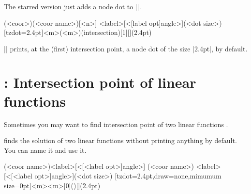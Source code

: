 The starred version \icmd{\tzhXpoint*} just adds a node dot to |\tzhXpoint|.

\begin{tzdef}
(<coor>)(<coor name>)[<n>]
           {<label>}[<[label opt]angle>](<dot size>)
  [tzdot=2.4pt]{<m>}(<m>)(intersection)[1]{}[](2.4pt)
\end{tzdef}

|\tzhXpoint*| prints, at the (first) intersection point, a node dot of the size |2.4pt|, by default.

\begin{tzcode}{.3}
\end{tzcode}


\section{\protect\cmd{\tzLFnXpoint(*)}: Intersection point of linear functions}
\label{s:tzLFnXpoint}

Sometimes you may want to  find intersection point of two linear functions .

\icmd{\tzLFnXpoint} finds the solution of two linear functions without printing anything by default.
You can name it and use it.

\begin{tzdef}
\tzLFnXpoint{<\fn>}{<\fn>}
\tzLFnXpoint{<\fn>}{<\fn>}(<coor name>){<label>}[<[<label opt>]angle>]
\tzLFnXpoint[<opt>]{<\fn>}{<\fn>}(<coor name>)
            {<label>}[<[<label opt>]angle>](<dot size>)
  [tzdot=2.4pt,draw=none,mimumum size=0pt]{<m>}{<m>}[0](){}[](2.4pt)
\end{tzdef}


\begin{tzcode}{.3}
{}
\end{tzcode}

